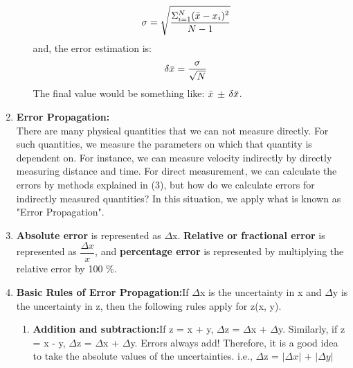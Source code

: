 \begin{enumerate}
\begin{enumerate}
        \begin{align*}
            \sigma &= \sqrt{\dfrac{\Sigma_{i = 1}^N (\Bar{x} - x_i)^2}{N-1}}
        \end{align*}
        and, the error estimation is: 
        \begin{align*}
            \delta\Bar{x} &= \dfrac{\sigma}{\sqrt{N}}
        \end{align*}
        The final value would be something like: $\Bar{x}$ $\pm$ $\delta \Bar{x}$. 
    \end{enumerate}
    \item \textbf{Error Propagation:}\\
    There are many physical quantities that we can not measure directly. For such quantities, we measure the parameters on which that quantity is dependent on. For instance, we can measure velocity indirectly by directly measuring distance and time. For direct measurement, we can calculate the errors by methods explained in (3), but how do we calculate errors for indirectly measured quantities? In this situation, we apply what is known as "Error Propagation".  
    \item \textbf{Absolute error} is represented as $\Delta$x. \textbf{Relative or fractional error} is represented as $\dfrac{\Delta x}{x}$, and \textbf{percentage error} is represented by multiplying the relative error by 100 \%. 
    
    \item \textbf{Basic Rules of Error Propagation:}If $\Delta$x is the uncertainty in x and $\Delta$y is the uncertainty in z, then the following rules apply for z(x, y).  
    \begin{enumerate}
        \item \textbf{Addition and subtraction:}If z = x + y, $\Delta$z = $\Delta$x + $\Delta$y. Similarly, if z = x - y, $\Delta$z = $\Delta$x + $\Delta$y. Errors always add! Therefore, it is a good idea to take the absolute values of the uncertainties. i.e., $\Delta$z = $|\Delta x|$ + $|\Delta y|$ 
        

\end{enumerate}
\end{enumerate}
